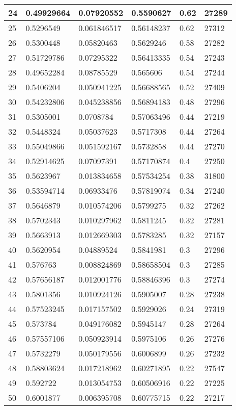\begin{longtable}{|l|l|l|l|l|l|}
24 & 0.49929664 & 0.07920552 & 0.5590627 & 0.62 & 27289 \\ \hline 
25 & 0.5296549 & 0.061846517 & 0.56148237 & 0.62 & 27312 \\ \hline 
26 & 0.5300448 & 0.05820463 & 0.5629246 & 0.58 & 27282 \\ \hline 
27 & 0.51729786 & 0.07295322 & 0.56413335 & 0.54 & 27243 \\ \hline 
28 & 0.49652284 & 0.08785529 & 0.565606 & 0.54 & 27244 \\ \hline 
29 & 0.5406204 & 0.050941225 & 0.56688565 & 0.52 & 27409 \\ \hline 
30 & 0.54232806 & 0.045238856 & 0.56894183 & 0.48 & 27296 \\ \hline 
31 & 0.5305001 & 0.0708784 & 0.57063496 & 0.44 & 27219 \\ \hline 
32 & 0.5448324 & 0.05037623 & 0.5717308 & 0.44 & 27264 \\ \hline 
33 & 0.55049866 & 0.051592167 & 0.5732858 & 0.44 & 27270 \\ \hline 
34 & 0.52914625 & 0.07097391 & 0.57170874 & 0.4 & 27250 \\ \hline 
35 & 0.5623967 & 0.013834658 & 0.57534254 & 0.38 & 31800 \\ \hline 
36 & 0.53594714 & 0.06933476 & 0.57819074 & 0.34 & 27240 \\ \hline 
37 & 0.5646879 & 0.010574206 & 0.5799275 & 0.32 & 27262 \\ \hline 
38 & 0.5702343 & 0.010297962 & 0.5811245 & 0.32 & 27281 \\ \hline 
39 & 0.5663913 & 0.012669303 & 0.5783285 & 0.32 & 27157 \\ \hline 
40 & 0.5620954 & 0.04889524 & 0.5841981 & 0.3 & 27296 \\ \hline 
41 & 0.576763 & 0.008824869 & 0.58658504 & 0.3 & 27285 \\ \hline 
42 & 0.57656187 & 0.012001776 & 0.58846396 & 0.3 & 27274 \\ \hline 
43 & 0.5801356 & 0.010924126 & 0.5905007 & 0.28 & 27238 \\ \hline 
44 & 0.57523245 & 0.017157502 & 0.5929026 & 0.24 & 27319 \\ \hline 
45 & 0.573784 & 0.049176082 & 0.5945147 & 0.28 & 27264 \\ \hline 
46 & 0.57557106 & 0.050923914 & 0.5975106 & 0.26 & 27276 \\ \hline 
47 & 0.5732279 & 0.050179556 & 0.6006899 & 0.26 & 27232 \\ \hline 
48 & 0.58803624 & 0.017218962 & 0.60271895 & 0.22 & 27547 \\ \hline 
49 & 0.592722 & 0.013054753 & 0.60506916 & 0.22 & 27225 \\ \hline 
50 & 0.6001877 & 0.006395708 & 0.60775715 & 0.22 & 27217 \\ \hline 
\end{longtable}